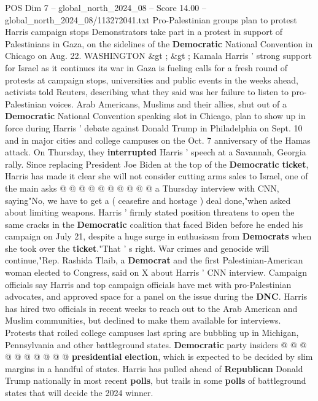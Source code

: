 \begin{textsample}{POS Dim 7 – global\_north\_2024\_08 – Score 14.00 – global\_north\_2024\_08/113272041.txt}  \label{ex:f7_pos_006}
Pro-Palestinian groups plan to protest Harris campaign stops Demonstrators take part in a protest in support of Palestinians in Gaza, on the sidelines of the \textbf{Democratic} National Convention in Chicago on Aug. 22.
WASHINGTON \&gt ; \&gt ; Kamala Harris ' strong support for Israel as it continues its war in Gaza is fueling calls for a fresh round of protests at campaign stops, universities and public events in the weeks ahead, activists told Reuters, describing what they said was her failure to listen to pro-Palestinian voices.
Arab Americans, Muslims and their allies, shut out of a \textbf{Democratic} National Convention speaking slot in Chicago, plan to show up in force during Harris ' debate against Donald Trump in Philadelphia on Sept. 10 and in major cities and college campuses on the Oct. 7 anniversary of the Hamas attack.
On Thursday, they \textbf{interrupted} Harris ' speech at a Savannah, Georgia rally.
Since replacing President Joe Biden at the top of the \textbf{Democratic} \textbf{ticket}, Harris has made it clear she will not consider cutting arms sales to Israel, one of the main asks @ @ @ @ @ @ @ @ @ @ a Thursday interview with CNN, saying"No, we have to get a ( ceasefire and hostage ) deal done,"when asked about limiting weapons.
Harris ' firmly stated position threatens to open the same cracks in the \textbf{Democratic} coalition that faced Biden before he ended his campaign on July 21, despite a huge surge in enthusiasm from \textbf{Democrats} when she took over the \textbf{ticket}."That ' s right.
War crimes and genocide will continue,"Rep.
Rashida Tlaib, a \textbf{Democrat} and the first Palestinian-American woman elected to Congress, said on X about Harris ' CNN interview.
Campaign officials say Harris and top campaign officials have met with pro-Palestinian advocates, and approved space for a panel on the issue during the \textbf{DNC}.
Harris has hired two officials in recent weeks to reach out to the Arab American and Muslim communities, but declined to make them available for interviews.
Protests that roiled college campuses last spring are bubbling up in Michigan, Pennsylvania and other battleground states. \textbf{Democratic} party insiders @ @ @ @ @ @ @ @ @ @ \textbf{presidential} \textbf{election}, which is expected to be decided by slim margins in a handful of states.
Harris has pulled ahead of \textbf{Republican} Donald Trump nationally in most recent \textbf{polls}, but trails in some \textbf{polls} of battleground states that will decide the 2024 winner.

\end{textsample}
